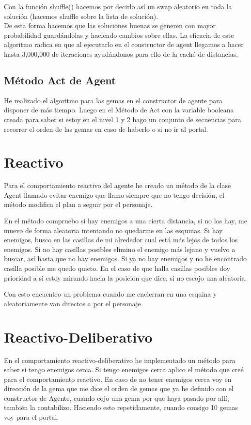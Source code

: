 \documentclass[a4paper,11pt]{article}
\begin{document}
Con la función shuffle() hacemos por decirlo así un swap aleatorio en toda la solución (hacemos shuffle sobre la lista de solución).\\

De esta forma hacemos que las soluciones buenas se generen con mayor probabilidad guardándolas y haciendo cambios sobre ellas. La eficacia de este algoritmo radica en que al ejecutarlo en el constructor de agent llegamos a hacer hasta 3,000,000 de iteraciones ayudándonos para ello de la caché de distancias.

\subsection{Método Act de Agent}

He realizado el algoritmo para las gemas en el constructor de agente para disponer de más tiempo. Luego en el Método de Act con la variable booleana creada para saber si estoy en el nivel 1 y 2 hago un conjunto de secuencias para recorrer el orden de las gemas en caso de haberlo o si no ir al portal.

\section{Reactivo}

Para el comportamiento reactivo del agente he creado un método de la clase Agent llamado evitar enemigo que llamo siempre que no tengo decisión, el método modifica el plan a seguir por el personaje.

En el método compruebo si hay enemigos a una cierta distancia, si no los hay, me muevo de forma aleatoria intentando no quedarme en las esquinas. Si hay enemigos, busco en las casillas de mi alrededor cual está más lejos de todos los enemigos. Si no hay casillas posibles elimino el enemigo más lejano y vuelvo a buscar, así hasta que no hay enemigos. Si ya no hay enemigos y no he encontrado casilla posible me quedo quieto. En el caso de que halla casillas posibles doy prioridad a si estoy mirando hacia la posición que dice, si no escojo una aleatoria.

Con esto encuentro un problema cuando me encierran en una esquina y aleatoriamente van directos a por el personaje.

\section{Reactivo-Deliberativo}

En el comportamiento reactivo-deliberativo he implementado un método para saber si tengo enemigos cerca. Si tengo enemigos cerca aplico el método que creé para el comportamiento reactivo. En caso de no tener enemigos cerca voy en dirección de la gema que me dice el orden de gemas que ya he definido con el constructor de Agente, cuando cojo una gema por que haya pasado por allí, también la contabilizo. Haciendo esto repetidamente, cuando consigo 10 gemas voy para el portal.
\end{document}
